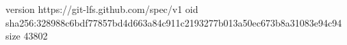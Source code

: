 version https://git-lfs.github.com/spec/v1
oid sha256:328988c6bdf77857bd4d663a84c911c2193277b013a50ec673b8a31083e94c94
size 43802
